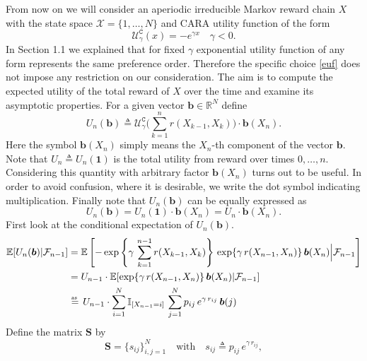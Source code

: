 From now on we will consider an aperiodic irreducible Markov reward chain $X$ with the state space $\mathcal{X}=\{1,\dots,N\}$ and CARA utility function of the form
\begin{equation}
\label{euf}
\mathcal{U}_{\gamma}^{\texttt{C}}(x)=-e^{\gamma x}\quad\gamma<0.
\end{equation}
In Section 1.1 we explained that for fixed $\gamma$ exponential utility function of any form represents the same preference order. Therefore the specific choice \eqref{euf} does not impose any restriction on our consideration. The aim is to  compute the expected utility of the total reward of $X$ over the time and examine its asymptotic properties. For a given vector $\bm{b}\in\mathbb{R}^N$ define
\begin{equation}
\label{Udef}
U_n(\bm{b})\triangleq\mathcal{U}_{\gamma}^{\texttt{C}}\Big(\sum_{k=1}^n r(X_{k-1},X_k)\Big)\cdot\bm{b}(X_n).
\end{equation}
Here the symbol $\bm{b}(X_n)$ simply means the $X_n$-th component of the vector $\bm{b}$. Note that $U_n\triangleq U_n(\bm{1})$ is the total utility from reward over times $0,\dots,n$. Considering this quantity with arbitrary factor $\bm{b}(X_n)$ turns out to be useful. In order to avoid confusion, where it is desirable, we write the dot symbol indicating multiplication. Finally note that $U_n(\bm{b})$ can be equally expressed as
\begin{equation}
\label{WeirdNotation}
U_n(\bm{b})=U_n(\bm{1})\cdot\bm{b}(X_n)=U_n\cdot\bm{b}(X_n).
\end{equation}
First look at the conditional expectation of $U_n(\bm{b})$.
\begin{equation}
\label{ExpComutation}
\begin{split}
\mathbb{E}[U_n(\bm{b})|\mathcal{F}_{n-1}]&=\mathbb{E}\left[-\exp\left\{ \gamma\,\sum_{k=1}^{n-1} r(X_{k-1},X_k) \right\}\,\exp\{\gamma\,r(X_{n-1},X_n)\}\,\bm{b}(X_n)\Big|\mathcal{F}_{n-1}\right]\\
&=U_{n-1}\cdot\mathbb{E}[\exp\{\gamma\,r(X_{n-1},X_n)\}\,\bm{b}(X_n)|\mathcal{F}_{n-1}]\\
&\aseq U_{n-1}\cdot\sum_{i=1}^{N}\mathbb{I}_{[X_{n-1}=i]}\,\sum_{j=1}^{N}p_{ij}\,e^{\gamma\,r_{ij}}\,\bm{b}(j)
\end{split}
\end{equation}
Define the matrix $\bm{S}$ by
\begin{equation}
\label{S}
\bm{S}=\{s_{ij}\}_{i,j=1}^{N} \quad \text{with} \quad s_{ij}\triangleq p_{ij}\,e^{\gamma\,r_{ij}},
\end{equation}

